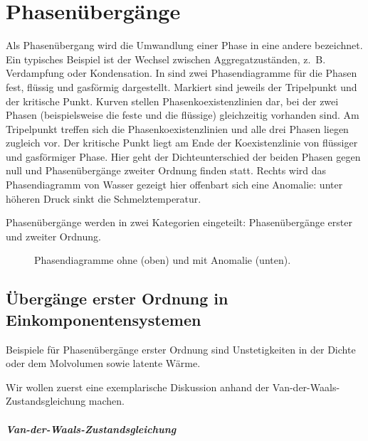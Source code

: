 
\chapter{Phasenübergänge\label{sec:phasenuebergaenge}}

Als Phasenübergang wird die Umwandlung einer Phase in eine andere bezeichnet. Ein typisches Beispiel ist der Wechsel zwischen Aggregatzuständen, z.~B. Verdampfung oder Kondensation. In  sind zwei Phasendiagramme für die Phasen fest, flüssig und gasförmig dargestellt. Markiert sind jeweils der Tripelpunkt und der kritische Punkt. Kurven stellen Phasenkoexistenzlinien dar, bei der zwei Phasen (beispielsweise die feste und die flüssige) gleichzeitig vorhanden sind. Am Tripelpunkt treffen sich die Phasenkoexistenzlinien und alle drei Phasen liegen zugleich vor. Der kritische Punkt liegt am Ende der Koexistenzlinie von flüssiger und gasförmiger Phase. Hier geht der Dichteunterschied der beiden Phasen gegen null und Phasenübergänge zweiter Ordnung finden statt. Rechts wird das Phasendiagramm von Wasser gezeigt \textendash{} hier offenbart sich eine Anomalie: unter höheren Druck sinkt die Schmelztemperatur.

Phasenübergänge werden in zwei Kategorien eingeteilt: Phasenübergänge erster und zweiter Ordnung.

\begin{figure}[htbp]
    \centering
    \tfigPhaseDiagramNoAnomaly

    \tfigPhaseDiagramWithAnomaly
    \caption{Phasendiagramme ohne (oben) und mit Anomalie (unten). }
    \label{fig:Phasendiagramme}
\end{figure}




\section{Übergänge erster Ordnung in Einkomponentensystemen}

Beispiele für Phasenübergänge erster Ordnung sind Unstetigkeiten in der Dichte oder dem Molvolumen sowie latente Wärme.

Wir wollen zuerst eine exemplarische Diskussion anhand der Van-der-Waals-Zustandsgleichung machen.


\paragraph*{Van-der-Waals-Zustandsgleichung}

